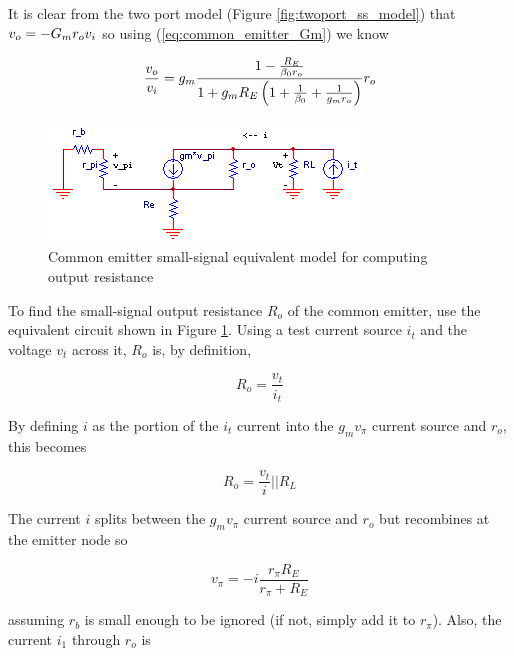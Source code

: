 It is clear from the two port model (Figure \ref{fig:twoport_ss_model}) that $v_o = -G_{m}r_{o}v_i$ so using (\ref{eq:common_emitter_Gm}) we know

\textcolor{red}{
\begin{equation}
\frac{v_o}{v_i} = g_{m}\frac{1-\frac{R_E}{\beta_0 r_o}}{1 + g_m R_E\left(1 + \frac{1}{\beta_0} + \frac{1}{g_m r_o}\right)}r_o
\label{eq:commonemitter_transferfunction}
\end{equation}
}

\begin{figure}
	\centering
		\includegraphics{schematics/commonemitter_Ro.PNG}
	\caption{Common emitter small-signal equivalent model for computing output resistance}
	\label{fig:commonemitter_Ro}
\end{figure}

To find the small-signal output resistance $R_{o}$ of the common emitter, use the equivalent circuit shown in Figure \ref{fig:commonemitter_Ro}. Using a test current source $i_{t}$ and the voltage $v_{t}$ across it, $R_{o}$ is, by definition,

\begin{equation}
R_{o} = \frac{v_{t}}{i_{t}}
\end{equation}

\noindent By defining $i$ as the portion of the $i_{t}$ current into the $g_{m}v_{\pi}$ current source and $r_{o}$, this becomes

\begin{equation}
R_{o} = \frac{v_{t}}{i}||R_{L}
\end{equation}

\noindent The current $i$ splits between the $g_{m}v_{\pi}$ current source and $r_{o}$ but recombines at the emitter node so

\begin{equation}
v_{\pi} = -i\frac{r_{\pi}R_{E}}{r_{\pi}+R_{E}}
\label{eq:commonemitter_Ro_v_pi}
\end{equation}

\noindent assuming $r_{b}$ is small enough to be ignored (if not, simply add it to $r_{\pi}$). Also, the current $i_{1}$ through $r_{o}$ is


